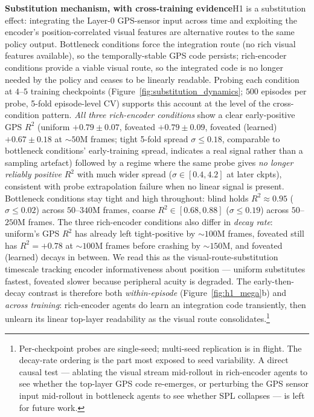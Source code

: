 \documentclass{article}
\newcommand{\uncertain}[1]{{\color{uncertaincol}#1}}
\newcommand{\pendnote}[1]{\footnote{\color{uncertaincol}\small #1}}
\begin{document}
\noindent\textbf{Substitution mechanism, with cross-training evidence}\quad H1 is a substitution effect: integrating the Layer-0 GPS-sensor input across time and exploiting the encoder's position-correlated visual features are alternative routes to the same policy output. Bottleneck conditions force the integration route (no rich visual features available), so the temporally-stable GPS code persists; rich-encoder conditions provide a viable visual route, so the integrated code is no longer needed by the policy and ceases to be linearly readable. Probing each condition at $4$--$5$ training checkpoints (Figure~\ref{fig:substitution_dynamics}; $500$ episodes per probe, 5-fold episode-level CV) supports this account at the level of the cross-condition pattern. \emph{All three rich-encoder conditions} show a clear early-positive GPS $R^2$ (uniform $+0.79\pm 0.07$, foveated $+0.79\pm 0.09$, foveated (learned) $+0.67 \pm 0.18$ at $\sim 50$M frames; tight 5-fold spread $\sigma \leq 0.18$, comparable to bottleneck conditions' early-training spread, indicates a real signal rather than a sampling artefact) followed by a regime where the same probe gives \emph{no longer reliably positive} $R^2$ with much wider spread ($\sigma \in [0.4, 4.2]$ at later ckpts), consistent with probe extrapolation failure when no linear signal is present. Bottleneck conditions stay tight and high throughout: blind holds $R^2 \approx 0.95$ ($\sigma \leq 0.02$) across $50$--$340$M frames, coarse $R^2 \in [0.68, 0.88]$ ($\sigma \leq 0.19$) across $50$--$250$M frames. \uncertain{The three rich-encoder conditions also differ in \emph{decay rate}: uniform's GPS $R^2$ has already left tight-positive by $\sim 100$M frames, foveated still has $R^2 = +0.78$ at $\sim 100$M frames before crashing by $\sim 150$M, and foveated (learned) decays in between. We read this as the visual-route-substitution timescale tracking encoder informativeness about position --- uniform substitutes fastest, foveated slower because peripheral acuity is degraded.} The early-then-decay contrast is therefore both \emph{within-episode} (Figure~\ref{fig:h1_mega}b) and \emph{across training}: rich-encoder agents do learn an integration code transiently, then unlearn its linear top-layer readability as the visual route consolidates.\pendnote{Per-checkpoint probes are single-seed; multi-seed replication is in flight. The decay-rate ordering is the part most exposed to seed variability. A direct causal test --- ablating the visual stream mid-rollout in rich-encoder agents to see whether the top-layer GPS code re-emerges, or perturbing the GPS sensor input mid-rollout in bottleneck agents to see whether SPL collapses --- is left for future work.}
\end{document}
